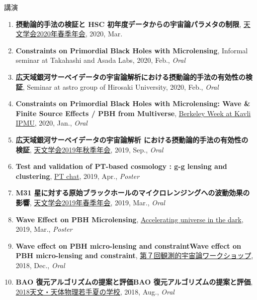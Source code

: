 \begin{rSection}{講演}
\begin{enumerate}
\item \textbf{摂動論的手法の検証と HSC 初年度データからの宇宙論パラメタの制限}, \href{http://www.asj.or.jp/nenkai/archive/2020a/pdf/U03a.pdf}{天文学会2020年春季年会}, 2020, Mar.
\item \textbf{Constraints on Primordial Black Holes with Microlensing}, Informal seminar at Takahashi and Asada Labs, 2020, Feb., \textit{Oral}
\item \textbf{広天域銀河サーベイデータの宇宙論解析における摂動論的手法の有効性の検証}, Seminar at astro group of Hirosaki University, 2020, Feb., \textit{Oral}
\item \textbf{Constraints on Primordial Black Holes with Microlensing: Wave \& Finite Source Effects / PBH from Multiverse}, \href{http://indico.ipmu.jp/event/313/overview}{Berkeley Week at Kavli IPMU}, 2020, Jan., \textit{Oral}
\item \textbf{広天域銀河サーベイデータの宇宙論解析 における摂動論的手法の有効性の検証}, \href{https://www.asj.or.jp/nenkai/archive/2019b/pdf/U20a.pdf}{天文学会2019年秋季年会}, 2019, Sep., \textit{Oral}
\item \textbf{Test and validation of PT-based cosmology : g-g lensing and clustering}, \href{http://pt-chat-kyoto.sciencesconf.org/}{PT chat}, 2019, Apr., \textit{Poster}
\item \textbf{M31 星に対する原始ブラックホールのマイクロレンジングへの波動効果の影響}, \href{https://www.asj.or.jp/nenkai/archive/2019a/pdf/U14a.pdf}{天文学会2019年春季年会}, 2019, Mar., \textit{Oral}
\item \textbf{Wave Effect on PBH Microlensing}, \href{http://www2.yukawa.kyoto-u.ac.jp/~aud2019/index.php}{Accelerating universe in the dark}, 2019, Mar., \textit{Poster}
\item \textbf{Wave effect on PBH micro-lensing and constraintWave effect on PBH micro-lensing and constraint}, \href{http://web.cc.yamaguchi-u.ac.jp/~rsaito/obscosmo2018/}{第７回観測的宇宙論ワークショップ}, 2018, Dec., \textit{Oral}
\item \textbf{BAO 復元アルゴリズムの提案と評価BAO 復元アルゴリズムの提案と評価}, \href{http://www.astro-wakate.org/ss2018/web/link.html}{2018天文・天体物理若手夏の学校}, 2018, Aug., \textit{Oral}
\end{enumerate}\end{rSection}
